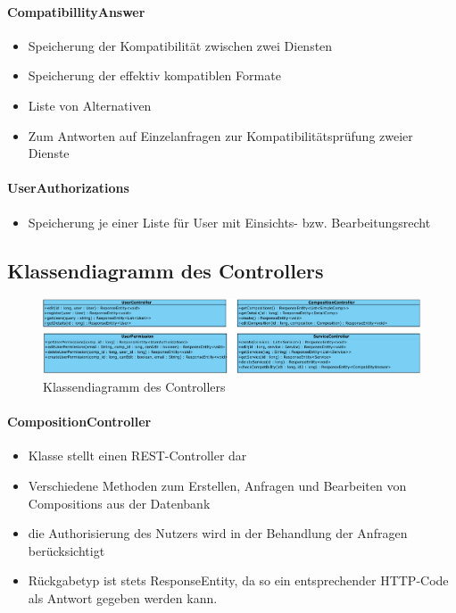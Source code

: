 \paragraph{CompatibillityAnswer}
\begin{itemize}
	\item Speicherung der Kompatibilität zwischen zwei Diensten
	\item Speicherung der effektiv kompatiblen Formate
	\item Liste von Alternativen
	\item Zum Antworten auf Einzelanfragen zur Kompatibilitätsprüfung zweier Dienste
\end{itemize}
\paragraph{UserAuthorizations}
\begin{itemize}
	\item Speicherung je einer Liste für User mit Einsichts- bzw. Bearbeitungsrecht
\end{itemize}

\subsection*{Klassendiagramm des Controllers}
\begin{figure}[!h]
	\centering
	\includegraphics[width=\textwidth]{img/Diagramme/Klassen/Controller}
	\caption{Klassendiagramm des Controllers}
	\label{fig:klassendiagramm-controller}
\end{figure}


\paragraph{CompositionController}
\begin{itemize}
	\item Klasse stellt einen REST-Controller dar
	\item Verschiedene Methoden zum Erstellen, Anfragen und Bearbeiten von Compositions aus der Datenbank
	\item die Authorisierung des Nutzers wird in der Behandlung der Anfragen berücksichtigt
	\item Rückgabetyp ist stets ResponseEntity, da so ein entsprechender HTTP-Code als Antwort gegeben werden kann.
\end{itemize}
